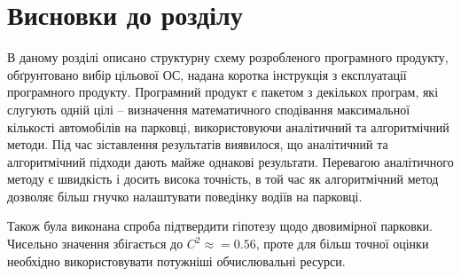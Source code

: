 \section*{Висновки до розділу}
В даному розділі описано структурну схему розробленого програмного продукту, обґрунтовано вибір цільової ОС, надана коротка інструкція з експлуатації програмного продукту. Програмний продукт є пакетом з декількох програм, які слугують одній цілі – визначення математичного сподівання максимальної кількості автомобілів на парковці, використовуючи аналітичний та алгоритмічний методи. Під час зіставлення результатів виявилося, що аналітичний та алгоритмічний підходи дають майже однакові результати. Перевагою аналітичного методу є швидкість і досить висока точність, в той час як алгоритмічний метод дозволяє більш гнучко налаштувати поведінку водіїв на парковці.

Також була виконана спроба підтвердити гіпотезу щодо двовимірної парковки. Чисельно значення збігається до $C^2 \approx = 0.56$, проте для більш точної оцінки необхідно використовувати потужніші обчислювальні ресурси.
